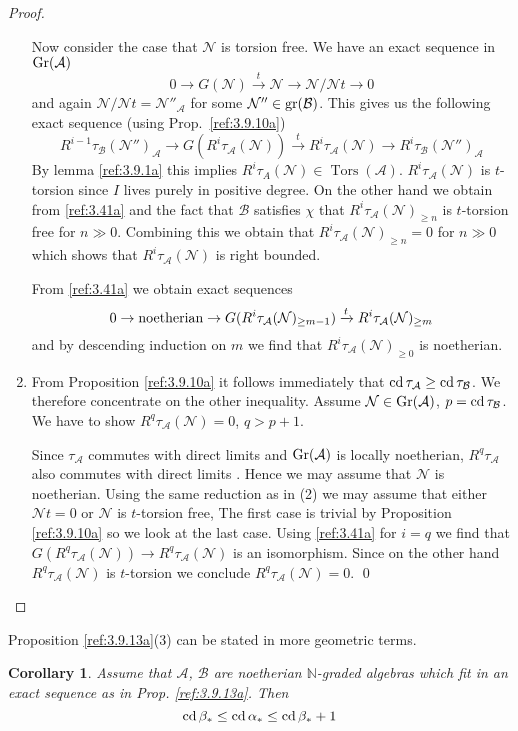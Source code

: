 \documentclass{amsproc}
\def \NN{{\mathbb N}}
\def\Ascr{{\mathcal A}}
\def\Bscr{{\mathcal B}}
\def\Nscr{{\mathcal N}}
\def\cd{\mathop{\text{cd}}}
\def\gr{\mathop{\text{gr}}}
\def\Gr{\mathop{\text{Gr}}}
\def\Tors{\operatorname{Tors}}
\def\gr{\operatorname {gr}}
\def\gr{\operatorname {gr}}
\def\Tors{\operatorname {Tors}}
\def\r{\rightarrow}
\let\oldtext\text
\def\text#1{\oldtext{\upshape #1}}
\newtheorem{corollarys}[lemmas]{Corollary}
\theoremstyle{definition}
\theoremstyle{remark}
\numberwithin{equation}{section}
\numberwithin{table}{section}
\numberwithin{figure}{section}
\def\gr{\mathop{\text{gr}}}
\def\Gr{\mathop{\text{Gr}}}
\begin{document}
\begin{proof}
\begin{enumerate}
Now consider the case that $\Nscr$ is torsion free. We have an exact sequence
in $\Gr(\Ascr)$ 
\[
0\r G(\Nscr)\xrightarrow{t} \Nscr\r \Nscr/\Nscr t\r 0
\]
and again $\Nscr/\Nscr t=\Nscr''_\Ascr$ for some $\Nscr''\in\gr(\Bscr)$. This
gives us the following exact sequence (using Prop.\ \ref{ref:3.9.10a})
\begin{equation}
\label{ref:3.41a}
R^{i-1}\tau_\Bscr(\Nscr'')_\Ascr\r G(R^i\tau_\Ascr(\Nscr))
\xrightarrow{t} R^i\tau_\Ascr(\Nscr)
\r 
R^i\tau_\Bscr(\Nscr'')_\Ascr
\end{equation}
By lemma \ref{ref:3.9.1a} this implies $R^i\tau_A(\Nscr)\in\Tors(\Ascr)$.
$R^i\tau_\Ascr(\Nscr)$ is
$t$-torsion since $I$ lives purely in positive 
 degree. On the other hand we obtain from \eqref{ref:3.41a} and the
fact that $\Bscr$ satisfies $\chi$ that $R^i\tau_\Ascr(\Nscr)_{\ge n}$
is $t$-torsion free for $n\gg 0$. Combining this we obtain that
$R^i\tau_\Ascr(\Nscr)_{\ge n}=0$ for $n\gg 0$ which shows that
$R^i\tau_\Ascr(\Nscr)$ is right bounded.

From \eqref{ref:3.41a} we obtain exact sequences
\[
0\r \text{noetherian} \r G(R^i\tau_\Ascr(\Nscr)_{\ge m-1})\xrightarrow{t}
R^i\tau_\Ascr(\Nscr)_{\ge m} 
\]
and by descending induction on $m$ we find that
$R^i\tau_\Ascr(\Nscr)_{\ge 0}$ is noetherian.
\item 
From Proposition \ref{ref:3.9.10a} it follows immediately that $\cd \tau_\Ascr\ge
\cd \tau_\Bscr$. We therefore concentrate on the
other inequality. Assume $\Nscr\in\Gr(\Ascr)$, $p=\cd\tau_\Bscr$. We
have to show $R^q\tau_\Ascr(\Nscr)=0$, $q>p+1$.

Since $\tau_\Ascr$ commutes with direct limits and $\Gr(\Ascr)$ is
locally noetherian,  $R^q\tau_\Ascr$ also commutes with direct limits
\cite{Groth1}. Hence we may assume that $\Nscr$ is
noetherian. Using the same reduction as in (2) we may assume that
either $\Nscr t=0$ or $\Nscr$ is $t$-torsion free, The first case is
trivial by Proposition \ref{ref:3.9.10a} so we look at the last case. Using
\eqref{ref:3.41a} for $i=q$ we find that $G(R^q\tau_\Ascr(\Nscr))\r
R^q\tau_\Ascr(\Nscr)$ is an isomorphism. Since on the other hand
$R^q\tau_\Ascr(\Nscr)$ is $t$-torsion we conclude $R^q\tau_\Ascr(\Nscr)=0$.
\qed\end{enumerate}
\def\qed{}\end{proof}
Proposition \ref{ref:3.9.13a}(3) can be stated in more geometric terms. 
\begin{corollarys} Assume that $\Ascr$, $\Bscr$ are noetherian
  $\NN$-graded algebras which fit in an exact sequence as in
  Prop. \ref{ref:3.9.13a}. Then
\begin{equation}
\label{ref:3.42a}
\cd\beta_\ast\le \cd \alpha_\ast\le \cd \beta_\ast+1
\end{equation}
\end{corollarys}
\end{document}
